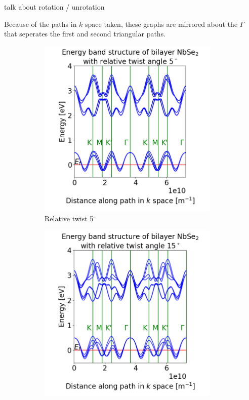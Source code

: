 \documentclass[12pt]{report} %
\begin{document}
talk about rotation / unrotation

Because of the paths in $k$ space taken, these graphs are mirrored about the $\Gamma$ that seperates the first and second triangular paths.
%
\begin{figure}[t!]
\centering
  \begin{subfigure}[t]{0.45\textwidth}
    \centering
    \includegraphics[width=0.95\textwidth]{bilayer_bands_5.png}
    \caption{
      Relative twist 5$^\circ$
    }
    \label{bilayer_bands_5}
  \end{subfigure}
  \hfill
  \begin{subfigure}[t]{0.45\textwidth}
    \centering
    \includegraphics[width=0.95\textwidth]{bilayer_bands_15.png}

\end{subfigure}
\end{figure}
\end{document}
